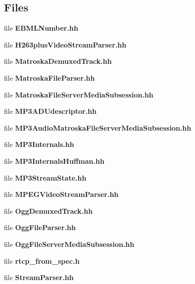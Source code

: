 \subsection*{Files}
\begin{DoxyCompactItemize}
\item 
file {\bf E\+B\+M\+L\+Number.\+hh}
\item 
file {\bf H263plus\+Video\+Stream\+Parser.\+hh}
\item 
file {\bf Matroska\+Demuxed\+Track.\+hh}
\item 
file {\bf Matroska\+File\+Parser.\+hh}
\item 
file {\bf Matroska\+File\+Server\+Media\+Subsession.\+hh}
\item 
file {\bf M\+P3\+A\+D\+Udescriptor.\+hh}
\item 
file {\bf M\+P3\+Audio\+Matroska\+File\+Server\+Media\+Subsession.\+hh}
\item 
file {\bf M\+P3\+Internals.\+hh}
\item 
file {\bf M\+P3\+Internals\+Huffman.\+hh}
\item 
file {\bf M\+P3\+Stream\+State.\+hh}
\item 
file {\bf M\+P\+E\+G\+Video\+Stream\+Parser.\+hh}
\item 
file {\bf Ogg\+Demuxed\+Track.\+hh}
\item 
file {\bf Ogg\+File\+Parser.\+hh}
\item 
file {\bf Ogg\+File\+Server\+Media\+Subsession.\+hh}
\item 
file {\bf rtcp\+\_\+from\+\_\+spec.\+h}
\item 
file {\bf Stream\+Parser.\+hh}
\end{DoxyCompactItemize}
